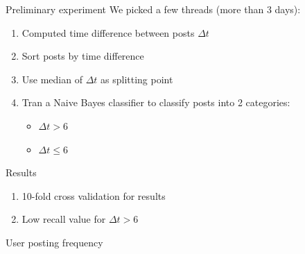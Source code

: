 \documentclass[compress]{beamer}
\begin{document}
\begin{frame}{Preliminary experiment}
We picked a few threads (more than 3 days):
\begin{enumerate}
	\item Computed time difference between posts $\Delta t$
	\item Sort posts by time difference
	\item Use median of $\Delta t$ as splitting point
	\item Tran a Naive Bayes classifier to classify posts into 2 categories:
	\begin{itemize}
		\item $\Delta t > 6$
		\item $\Delta t \leq 6$
	\end{itemize}
\end{enumerate}
\end{frame}

\begin{frame}{Results}

\begin{table}
	\label{table:naivebayesresults}
	\caption{Naive Bayes classification results}
\end{table}
\begin{enumerate}
	\item 10-fold cross validation for results
	\item Low recall value for $\Delta t > 6$
\end{enumerate}
\end{frame}
\begin{frame}{User posting frequency}
\begin{figure}\label{sleepcycle}
\end{figure}
\end{frame}
\end{document}
